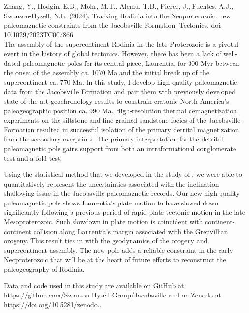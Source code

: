\documentclass{ucbthesis}
\begin{document}
\begin{frontmatter}
Zhang, Y., Hodgin, E.B., Mohr, M.T., Alemu, T.B., Pierce, J., Fuentes, A.J., Swanson-Hysell, N.L. (2024). Tracking Rodinia into the Neoproterozoic: new paleomagnetic constraints from the Jacobsville Formation. Tectonics. doi: 10.1029/2023TC007866
\\

The assembly of the supercontinent Rodinia in the late Proterozoic is a pivotal event in the history of global tectonics. However, there has been a lack of well-dated paleomagnetic poles for its central piece, Laurentia, for 300 Myr between the onset of the assembly ca. 1070 Ma and the initial break up of the supercontinent ca. 770 Ma. In this study, I develop high-quality paleomagnetic data from the Jacobsville Formation and pair them with previously developed state-of-the-art geochronology results to constrain cratonic North America's paleogeographic position ca. 990 Ma. High-resolution thermal demagnetization experiments on the siltstone and fine-grained sandstone facies of the Jacobsville Formation resulted in successful isolation of the primary detrital magnetization from the secondary overprints. The primary interpretation for the detrital paleomagnetic pole gains support from both an intraformational conglomerate test and a fold test. 
 
Using the statistical method that we developed in the study of \cite{Pierce2022a}, we were able to quantitatively represent the uncertainties associated with the inclination shallowing issue in the Jacobsville paleomagnetic records. Our new high-quality paleomagnetic pole shows Laurentia's plate motion to have slowed down significantly following a previous period of rapid plate tectonic motion in the late Mesoproterozoic. Such slowdown in plate motion is coincident with continent-continent collision along Laurentia's margin associated with the Grenvillian orogeny. This result ties in with the geodynamics of the orogeny and supercontinent assembly. The new pole adds a reliable constraint in the early Neoproterozoic that will be at the heart of future efforts to reconstruct the paleogeography of Rodinia.

Data and code used in this study are available on GitHub at \url{https://github.com/Swanson-Hysell-Group/Jacobsville} and on Zenodo at \url{https://doi.org/10.5281/zenodo.}.

\begin{acknowledgements}


\end{acknowledgements}
\end{frontmatter}
\end{document}
